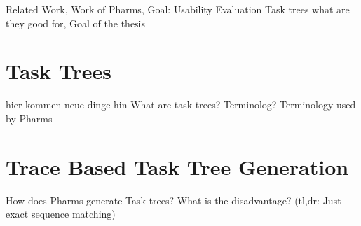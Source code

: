 Related Work, Work of Pharms, Goal: Usability Evaluation \citep{harms2013}
Task trees what are they good for, Goal of the thesis
\section{Task Trees}
hier kommen neue dinge hin
What are task trees? Terminolog? Terminology used by Pharms
\section{Trace Based Task Tree Generation}
How does Pharms generate Task trees? What is the disadvantage? (tl,dr: Just exact sequence matching)



